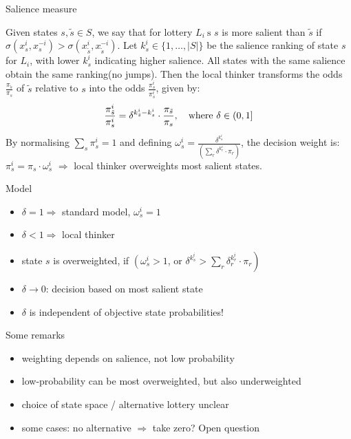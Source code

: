 \documentclass[11pt, aspectratio=169]{beamer}
\begin{document}
\begin{frame}{Salience measure}
    \begin{definition}
        Given states $s, \tilde{s} \in S$, we say that for lottery $L_i \mathrm{~s}$ $s$ is more salient than $\tilde{s}$ if $\sigma\left(x_s^i, x_s^{-i}\right)>\sigma\left(x_{\tilde{s}}^i, x_{\tilde{s}}^{-i}\right)$.
        Let $k_s^i \in\{1, \ldots,|S|\}$ be the salience ranking of state $s$ for $L_i$, with lower $k_s^i$ indicating higher salience.
        All states with the same salience obtain the same ranking(no jumps). Then the local thinker transforms the odds $\frac{\pi_{\tilde{s}}}{\pi_s}$ of $\tilde{s}$ relative to $s$ into the odds $\frac{\pi_s^i}{\pi_s^i}$, given by:
        \[
        \frac{\pi_{\tilde{s}}^i}{\pi_s^i}=\delta^{k_{\tilde{s}}^i-k_s^i} \cdot \frac{\pi_{\tilde{s}}}{\pi_s}, \text{\quad where } \delta \in(0,1]
        \]
        By normalising $\sum_s \pi_s^i=1$ and defining $\omega_s^i=\frac{\delta^{k_s^i}}{\left(\sum_r \delta^{k_r^i} \cdot \pi_r\right)}$, the decision weight is: $\pi_s^i=\pi_s \cdot \omega_s^i$
        $\Rightarrow$ local thinker overweights most salient states.
    \end{definition}
\end{frame}

\begin{frame}{Model}
    \begin{itemize}
        \item $\delta=1 \Rightarrow$ standard model, $\omega_s^i=1$\medskip
        \item $\delta<1 \Rightarrow$ local thinker\medskip
        \item state $s$ is overweighted, if $\left(\omega_s^i>1\right.$, or $\left.\delta^{k_s^i}>\sum_r \delta_r^{k_r^i} \cdot \pi_r\right)$\medskip
        \item $\delta \rightarrow 0$: decision based on most salient state\medskip
        \item $\delta$ is independent of objective state probabilities!\medskip
    \end{itemize}
\end{frame}

\begin{frame}{Some remarks}
    \begin{itemize}
        \item weighting depends on salience, not low probability\medskip
        \item low-probability can be most overweighted, but also underweighted\medskip
        \item choice of state space / alternative lottery unclear\medskip
        \item some cases: no alternative $\Rightarrow$ take zero? Open question\medskip
    \end{itemize}
\end{frame}
\end{document}
